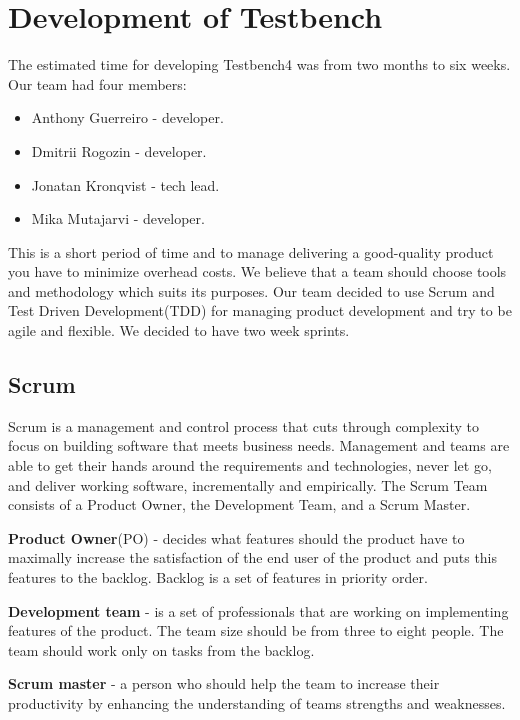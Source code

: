\chapter{Development of Testbench}
\label{ch:testbenchdevelop}
  
  The estimated time for developing Testbench4 was from two months to six weeks.
  Our team had four members:
  \begin{itemize}
    \item Anthony Guerreiro - developer.
    \item Dmitrii Rogozin - developer.
    \item Jonatan Kronqvist - tech lead.
    \item Mika Mutajarvi - developer.
    
  \end{itemize}
  
   This is a short period of time and to manage delivering a good-quality product you
    have to minimize overhead costs. We believe that a team should choose tools
    and methodology which suits its purposes. 
    Our team decided to use Scrum and Test Driven Development(TDD) for managing
    product development and try to be agile and flexible. 
    We decided to have two week sprints.

  \section{Scrum}
    Scrum is a management and control process that cuts through
    complexity to focus on building software that meets business needs. Management and teams are able to get their
    hands around the requirements and technologies, never let go, and deliver working software,
    incrementally and empirically. The Scrum Team consists of a Product Owner,
    the Development Team, and a Scrum Master.
    
  \textbf{Product Owner}(PO) - decides what features should the product have to
  maximally increase the satisfaction of the end user of the product and puts this features to the backlog.
  Backlog is a set of features in priority order.
  
  \textbf{Development team} - is
  a set of professionals that are working on implementing features of the product. 
  The team size should be from three to eight people. The team should work only on tasks from the backlog.
  
  \textbf{Scrum master} - a person who should help the team to increase their
  productivity by enhancing the understanding of teams strengths and weaknesses.

